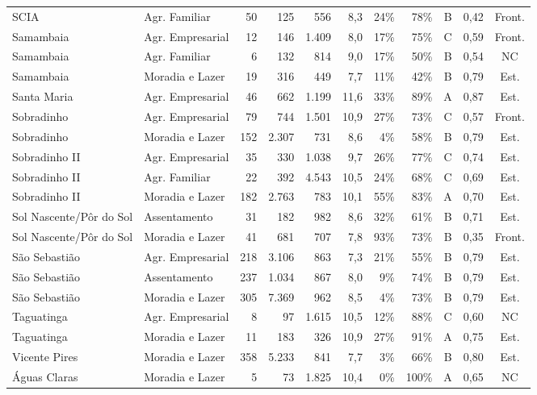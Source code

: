 {\begin{longtable}{@{}l l r r r r r r c c c@{}}
SCIA & Agr. Familiar & 50 & 125 & 556 & 8,3 & 24\% & 78\% & B & 0,42 & Front. \\
Samambaia & Agr. Empresarial & 12 & 146 & 1.409 & 8,0 & 17\% & 75\% & C & 0,59 & Front. \\
Samambaia & Agr. Familiar & 6 & 132 & 814 & 9,0 & 17\% & 50\% & B & 0,54 & NC \\
Samambaia & Moradia e Lazer & 19 & 316 & 449 & 7,7 & 11\% & 42\% & B & 0,79 & Est. \\
Santa Maria & Agr. Empresarial & 46 & 662 & 1.199 & 11,6 & 33\% & 89\% & A & 0,87 & Est. \\
Sobradinho & Agr. Empresarial & 79 & 744 & 1.501 & 10,9 & 27\% & 73\% & C & 0,57 & Front. \\
Sobradinho & Moradia e Lazer & 152 & 2.307 & 731 & 8,6 & 4\% & 58\% & B & 0,79 & Est. \\
Sobradinho II & Agr. Empresarial & 35 & 330 & 1.038 & 9,7 & 26\% & 77\% & C & 0,74 & Est. \\
Sobradinho II & Agr. Familiar & 22 & 392 & 4.543 & 10,5 & 24\% & 68\% & C & 0,69 & Est. \\
Sobradinho II & Moradia e Lazer & 182 & 2.763 & 783 & 10,1 & 55\% & 83\% & A & 0,70 & Est. \\
Sol Nascente/Pôr do Sol & Assentamento & 31 & 182 & 982 & 8,6 & 32\% & 61\% & B & 0,71 & Est. \\
Sol Nascente/Pôr do Sol & Moradia e Lazer & 41 & 681 & 707 & 7,8 & 93\% & 73\% & B & 0,35 & Front. \\
São Sebastião & Agr. Empresarial & 218 & 3.106 & 863 & 7,3 & 21\% & 55\% & B & 0,79 & Est. \\
São Sebastião & Assentamento & 237 & 1.034 & 867 & 8,0 & 9\% & 74\% & B & 0,79 & Est. \\
São Sebastião & Moradia e Lazer & 305 & 7.369 & 962 & 8,5 & 4\% & 73\% & B & 0,79 & Est. \\
Taguatinga & Agr. Empresarial & 8 & 97 & 1.615 & 10,5 & 12\% & 88\% & C & 0,60 & NC \\
Taguatinga & Moradia e Lazer & 11 & 183 & 326 & 10,9 & 27\% & 91\% & A & 0,75 & Est. \\
Vicente Pires & Moradia e Lazer & 358 & 5.233 & 841 & 7,7 & 3\% & 66\% & B & 0,80 & Est. \\
Águas Claras & Moradia e Lazer & 5 & 73 & 1.825 & 10,4 & 0\% & 100\% & A & 0,65 & NC \\
\end{longtable}
}
